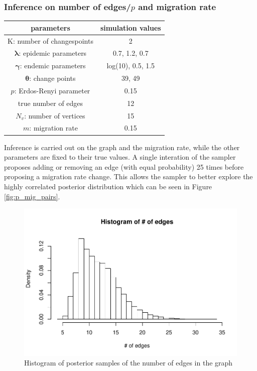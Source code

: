 \documentclass[11pt,a4paper]{article}
\numberwithin{equation}{section}
\begin{document}
\hypertarget{inference-on-number-of-edgesp-and-migration-rate}{%
\subsubsection{\texorpdfstring{Inference on number of edges/\(p\) and
migration
rate}{Inference on number of edges/p and migration rate}}\label{inference-on-number-of-edgesp-and-migration-rate}}

\begin{longtable}[]{@{}cc@{}}
\toprule
parameters & simulation values\tabularnewline
\midrule
\endhead
K: number of changespoints & 2\tabularnewline
\(\boldsymbol{\lambda}\): epidemic parameters & 0.7, 1.2,
0.7\tabularnewline
\(\boldsymbol{\gamma}\): endemic parameters & log(10), 0.5,
1.5\tabularnewline
\(\boldsymbol{\theta}\): change points & 39, 49\tabularnewline
\(p\): Erdos-Renyi parameter & 0.15\tabularnewline
true number of edges & 12\tabularnewline
\(N_v\): number of vertices & 15\tabularnewline
\(m\): migration rate & 0.15\tabularnewline
\bottomrule
\end{longtable}

Inference is carried out on the graph and the migration rate, while the
other parameters are fixed to their true values. A single interation of
the sampler proposes adding or removing an edge (with equal probability)
25 times before proposing a migration rate change. This allows the
sampler to better explore the highly correlated posterior distribution
which can be seen in Figure \ref{fig:p_mig_pairs}.

\begin{figure}
\centering
\includegraphics{thesis_draft_files/figure-latex/unnamed-chunk-9-1.pdf}
\caption{\label{fig:hist_edges} Histogram of posterior samples of the
number of edges in the graph}
\end{figure}
\end{document}
